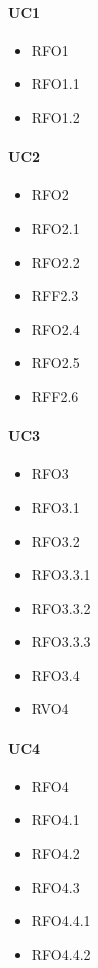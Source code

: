 \paragraph{UC1}
\quad
\begin{multicols}{3}
    \begin{itemize}
        \item RFO1
        \item RFO1.1
        \item RFO1.2
    \end{itemize}
\end{multicols}

\paragraph{UC2}
\quad
\begin{multicols}{3}
    \begin{itemize}
        \item RFO2
        \item RFO2.1
        \item RFO2.2
        \item RFF2.3
        \item RFO2.4
        \item RFO2.5
        \item RFF2.6
    \end{itemize}
\end{multicols}

\paragraph{UC3}
\quad
\begin{multicols}{3}
    \begin{itemize}
        \item RFO3
        \item RFO3.1
        \item RFO3.2
        \item RFO3.3.1
        \item RFO3.3.2
        \item RFO3.3.3
        \item RFO3.4
        \item RVO4
    \end{itemize}
\end{multicols}

\paragraph{UC4}
\quad
\begin{multicols}{3}
    \begin{itemize}
        \item RFO4
        \item RFO4.1
        \item RFO4.2
        \item RFO4.3
        \item RFO4.4.1
        \item RFO4.4.2
    \end{itemize}
\end{multicols}

